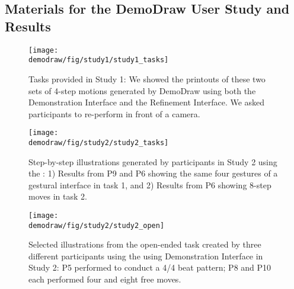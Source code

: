 \begin{appendices}
\clearpage


\subsection{Materials for the DemoDraw User Study and Results}

\begin{figure}[h!]
     \centering
    \texttt{[image: \\demodraw/fig/study1/study1\_tasks]}
    \caption{Tasks provided in Study 1: We showed the printouts of these two sets of 4-step motions generated by DemoDraw using both the Demonstration Interface and the Refinement Interface. We asked participants to re-perform in front of a camera.}
    \label{fig:study_review_tasks}
 \end{figure}

   \vspace{6mm}
\begin{figure}[h!]
     \centering
    \texttt{[image: \\demodraw/fig/study2/study2\_tasks]}
    \caption{Step-by-step illustrations generated by participants in Study 2 using the \phaseI{}: 1) Results from P9 and P6 showing the same four gestures of a gestural interface in task 1, and 2) Results from P6 showing 8-step moves in task 2.}
    \label{fig:study_authoring_tasks}
   \end{figure}

   \vspace{6mm}
\begin{figure}[h!]
     \centering
    \texttt{[image: \\demodraw/fig/study2/study2\_open]}
    \caption{Selected illustrations from the open-ended task created by three different participants using the using Demonstration Interface in Study 2: P5 performed to conduct a 4/4 beat pattern; P8 and P10 each performed four and eight free moves.}
    \label{fig:open_ended_examples}
 \end{figure}

\end{appendices}
